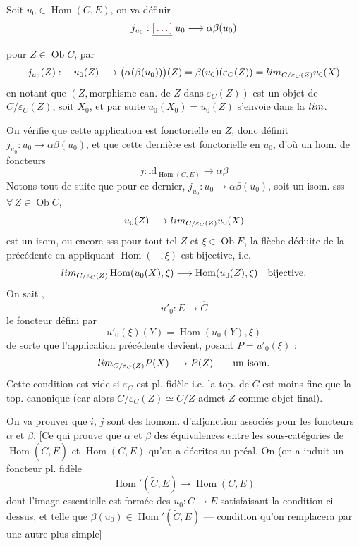\documentclass[11pt,a4paper]{article}
\begin{document}
Soit $u_{0} \in \operatorname{Hom}(C,E)$, on va définir
\[
j_{u_{0}} : \struck{\ill{}}\; u_{0} \longrightarrow \alpha\beta(u_{0})
\]
\struck{\ill{}}  pour $Z \in \operatorname{Ob} C$, par
\[
j_{u_{0}}(Z) : \quad u_{0}(Z) \longrightarrow
\bigl(\alpha(\beta(u_{0}))\bigr)(Z)
= \beta(u_{0})(\varepsilon_{C}(Z))
= \varinjlim_{C/\varepsilon_{C}(Z)} u_{0}(X)
\]
en notant que $(Z, \text{morphisme can. de } Z \text{ dans }
\varepsilon_{C}(Z))$ est un objet de $C/\varepsilon_{C}(Z)$, soit $X_{0}$, et
par suite $u_{0}(X_{0}) = u_{0}(Z)$ s'envoie dans la $\varinjlim$.

On vérifie que cette application est fonctorielle en $Z$, donc définit
$j_{u_{0}} : u_{0} \to \alpha\beta(u_{0})$, et que cette dernière est
fonctorielle en $u_{0}$, d'où un hom. de foncteurs
\[
\boxed{\;j : \mathrm{id}_{\operatorname{Hom}(C,E)} \longrightarrow \alpha\beta\;}
\]
 Notons tout de suite que pour  ce dernier,
$j_{u_{0}} : u_{0} \to \alpha\beta(u_{0})$, soit un isom. sss
\struck{\ill{}} $\forall\, Z \in \operatorname{Ob} C$,
\[
u_{0}(Z) \longrightarrow \varinjlim_{C/\varepsilon_{C}(Z)} u_{0}(X)
\]
est un isom, ou encore sss pour tout tel $Z$ et $\xi \in \operatorname{Ob} E$,
la flèche déduite de la précédente en appliquant $\operatorname{Hom}(-, \xi)$
est bijective, i.e.
\[
\varprojlim_{C/\varepsilon_{C}(Z)} \operatorname{Hom}(u_{0}(X), \xi)
\longrightarrow \operatorname{Hom}(u_{0}(Z), \xi)
\quad\text{bijective.}
\]
On sait \struck{\ill{}},
\[
u'_{0} : E \longrightarrow \widehat{C}
\]
le foncteur défini par
\[
u'_{0}(\xi)(Y) = \operatorname{Hom}(u_{0}(Y), \xi)
\]
de sorte que l'application précédente devient, posant $P = u'_{0}(\xi)$ :
\[
\varprojlim_{C/\varepsilon_{C}(Z)} P(X) \longrightarrow P(Z)
\qquad\text{un isom.}
\]
\struck{\ill{}} Cette condition est vide si $\varepsilon_{C}$ est pl. fidèle
i.e. la top. de $C$ est moins fine que la top. canonique (car alors
$C/\varepsilon_{C}(Z) \simeq C/Z$ admet $Z$ comme objet final).

On va prouver que $i$, $j$ sont des homom. d'adjonction associés pour les
foncteurs $\alpha$ et $\beta$. [Ce qui prouve que $\alpha$ et $\beta$
  des équivalences entre les
sous-catégories  de $\operatorname{Hom}(\widetilde{C},E)$ et
$\operatorname{Hom}(C,E)$ qu'on a décrites au préal. On \struck{\ill{}}
\struck{\ill{}} (on a induit un foncteur pl. fidèle
\[
\operatorname{Hom}'(\widetilde{C}, E) \longrightarrow \operatorname{Hom}(C,E)
\]
dont l'image essentielle est formée des \struck{\ill{}} $u_{0} : C \to E$
satisfaisant la condition ci-dessus, et telle que $\beta(u_{0}) \in
\operatorname{Hom}'(\widetilde{C}, E)$ — condition qu'on remplacera par une
autre plus simple]
\end{document}
